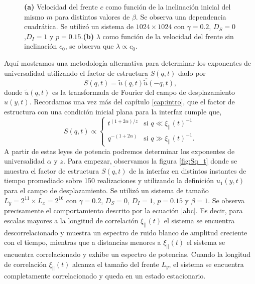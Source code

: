 \begin{figure}[t]
\begin{subfigure}{0.55\textwidth}
    \caption{}
\end{subfigure}
    \caption[Velocidad del frente de infección en función de $m$ y $\beta_m$]{\textbf{(a)} Velocidad del frente $c$ como función de la inclinación inicial del mismo $m$ para distintos valores de $\beta$. Se observa una dependencia cuadrática. Se utilizó un sistema de $1024\times1024$ con $\gamma = 0.2$, $D_S=0$,$D_I=1$ y $p=0.15$.\textbf{(b)} $\lambda$ como función de la velocidad del frente sin inclinación $c_0$, se observa que $\lambda\propto c_0$.}
    \label{fig:tilted_velocity}
\end{figure}


Aquí mostramos una metodología alternativa para determinar los exponentes de universalidad utilizando el factor de estructura $S(q,t)$ dado por 
\begin{equation}
    S(q,t) = \overline{\tilde{u}(q,t)\tilde{u}(-q,t)},
\end{equation}
donde $\tilde{u}(q,t)$ es la transformada de Fourier del campo de desplazamiento $u(y,t)$. Recordamos una vez más del capítulo \ref{cap:intro}, que el factor de estructura con una condición inicial plana para la interfaz cumple que,
\begin{equation}
    S(q,t) \propto 
    \begin{cases}
        t^{(1+2\alpha)/z} & \text{si } q \ll \xi_{||}(t)^{-1} \\
        q^{-(1+2\alpha)} & \text{si } q \gg \xi_{||}(t)^{-1}.
    \end{cases}
    \label{abc}
\end{equation}
A partir de estas leyes de potencia podremos determinar los exponentes de universalidad $\alpha$ y $z$. Para empezar, observamos la figura \ref{fig:Sq_t} donde se muestra el factor de estructura $\overline{S(q,t)}$ de la interfaz en distintos instantes de tiempo promediado sobre 150 realizaciones y utilizando la definición $u_1(y,t)$ para el campo de desplazamiento. Se utilizó un sistema de tamaño $L_y = 2^{11}\times L_x = 2^{16}$ con $\gamma = 0.2$, $D_S = 0$, $D_I = 1$, $p = 0.15$ y $\beta = 1$. Se observa precisamente el comportamiento descrito por la ecuación \ref{abc}. Es decir, para escalas mayores a la longitud de correlación $\xi_{||}(t)$ el sistema se encuentra descorrelacionado y muestra un espectro de ruido blanco de amplitud creciente con el tiempo, mientras que a distancias menores a $\xi_{||}(t)$ el sistema se encuentra correlacionado y exhibe un espectro de potencias. Cuando la longitud de correlación $\xi_{||}(t)$ alcanza el tamaño del frente $L_y$, el sistema se encuentra completamente correlacionado y queda en un estado estacionario.

